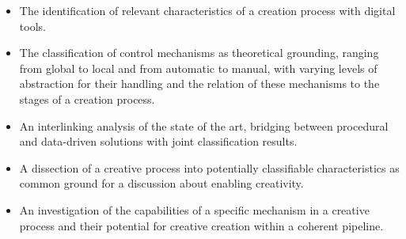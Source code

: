 
\begin{itemize}
    \item The identification of relevant characteristics of a creation process with digital tools.
    \item The classification of control mechanisms as theoretical grounding, ranging from global to local and from automatic to manual, with varying levels of abstraction for their handling and the relation of these mechanisms to the stages of a creation process. 
    \item An interlinking analysis of the state of the art, bridging between procedural and data-driven solutions with joint classification results. 
    \item A dissection of a creative process into potentially classifiable characteristics as common ground for a discussion about enabling creativity.
    \item An investigation of the capabilities of a specific mechanism in a creative process and their potential for creative creation within a coherent pipeline.
\end{itemize}
